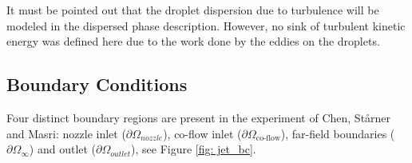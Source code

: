 It must be pointed out that the droplet dispersion due to turbulence will be modeled in the dispersed phase description. 
However, no sink of turbulent kinetic energy was defined here due to the work done by the eddies on the droplets. 

\subsection{Boundary Conditions}

Four distinct boundary regions are present in the experiment of Chen, St\aa{}rner and Masri:
 nozzle inlet ($\partial \Omega_{nozzle}$), co-flow inlet ($\partial \Omega_{\text{co-flow}}$), far-field boundaries ($\partial \Omega_{\infty}$) and outlet ($\partial \Omega_{outlet}$), see Figure \ref{fig: jet_bc}.


